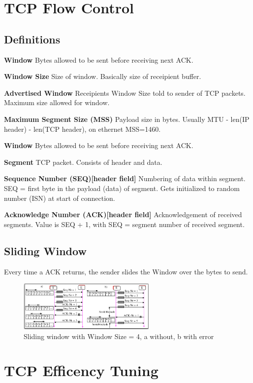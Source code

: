 \documentclass{article}
\begin{document}
\pagebreak

\section{TCP Flow Control}
\subsection{Definitions}
\label{sbsec:flow_defs}
\textbf{Window}
Bytes allowed to be sent before receiving next ACK.


\textbf{Window Size}
Size of window. Basically size of receipient buffer.

\textbf{Advertised Window}
Receipients Window Size told to sender of TCP packets. Maximum size allowed for window.

\textbf{Maximum Segment Size (MSS)}
Payload size in bytes. Usually MTU - len(IP header) - len(TCP header), on ethernet MSS=1460.

\textbf{Window}
Bytes allowed to be sent before receiving next ACK.

\textbf{Segment}
TCP packet. Consists of header and data.

\textbf{Sequence Number (SEQ)[header field]}
Numbering of data within segment. SEQ = first byte in the payload (data) of segment. Gets initialized to random number (ISN) at start of connection.

\textbf{Acknowledge Number (ACK)[header field]}
Acknowledgement of received segments. Value is SEQ + 1, with SEQ = segment number of received segment.

\subsection{Sliding Window}
Every time a ACK returns, the sender slides the Window over the bytes to send.
\begin{figure}[h]
    \centering
    \includegraphics[width=0.6\textwidth]{media/sliding_window.png}
    \caption{Sliding window with Window Size = 4, a without, b with error}
    \label{fig:sliding}
\end{figure}


\section{TCP Efficency Tuning}
\end{document}
